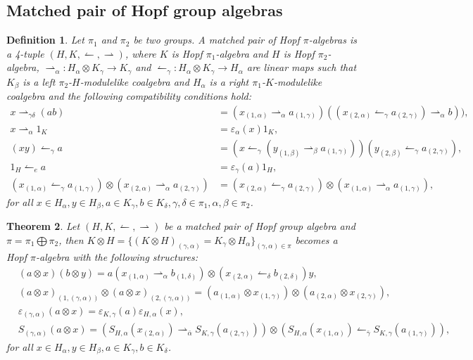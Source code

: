 \documentclass[11pt]{article}
\def\a{\alpha}
\def\b{\beta}
\def\d{\delta}
\def\g{\gamma}
\def\o{\otimes}
\def\v{\varepsilon}
\newtheorem{theorem}{Theorem}[section]
\newtheorem{definition}[theorem]{Definition}
\begin{document}
\subsection{Matched pair of Hopf group algebras}



 \begin{definition}
Let $\pi_1$ and $\pi_2$ be two groups. A matched pair of Hopf $\pi$-algebras is a 4-tuple $(H, K,\leftharpoonup,\rightharpoonup)$, where $K$ is Hopf $\pi_1$-algebra and $H$ is Hopf $\pi_2$-algebra, $\rightharpoonup_{\a}:H_\a\o K_\g\rightarrow K_\g$ and $\leftharpoonup_{\g}:H_\a\o K_\g \rightarrow H_\a$ are linear maps such that $K_\b$ is a left $\pi_2$-$H$-modulelike coalgebra and $H_\a$ is a right $\pi_1$-$K$-modulelike coalgebra and the following compatibility
conditions hold:
\begin{align}
x\rightharpoonup_{\g\d}(ab)&=(x_{(1,\a)}\rightharpoonup_{\a}a_{(1,\g)})((x_{(2,\a)}\leftharpoonup_{\g}a_{(2,\g)})\rightharpoonup_\a b)),\label{mp1}\\
x\rightharpoonup_{\a}1_K&=\v_\a(x)1_K,\label{mp2}\\
(xy)\leftharpoonup_{\g}a&=(x\leftharpoonup_{\g}(y_{(1,\b)}\rightharpoonup_{\b}a_{(1,\g)}))(y_{(2,\b)}\leftharpoonup_{\g}a_{(2,\g)}),\label{mp3}\\
1_H\leftharpoonup_e a&=\v_\g(a)1_H,\label{mp4}\\
(x_{(1,\a)}\leftharpoonup_\g a_{(1,\g)})\o(x_{(2,\a)}\rightharpoonup_\a a_{(2,\g)})&=(x_{(2,\a)}\leftharpoonup_\g a_{(2,\g)})\o(x_{(1,\a)}\rightharpoonup_\a a_{(1,\g)}),\label{mp5}
\end{align}
for all $x\in H_\a,y\in H_\b,a\in K_\g,b\in K_\d,\g,\d\in\pi_1,\a,\b\in\pi_2$.
\end{definition}

\begin{theorem}
Let $(H, K,\leftharpoonup,\rightharpoonup)$ be a matched pair of Hopf group algebra and $\pi=\pi_1\bigoplus\pi_2$, then $K\o H=\{(K\o H)_{(\g,\a)}=K_\g\o H_\a\}_{(\g,\a)\in\pi}$ becomes a Hopf $\pi$-algebra with the following structures:
\begin{align*}
&(a\o x)(b\o y)=a(x_{(1,\a)}\rightharpoonup_\a b_{(1,\d)})\o(x_{(2,\a)}\leftharpoonup_\d b_{(2,\d)})y,\\
&(a\o x)_{(1,(\g,\a))}\o (a\o x)_{(2,(\g,\a))}=(a_{(1,\a)}\o x_{(1,\g)})\o (a_{(2,\a)}\o x_{(2,\g)}),\\
&\v_{(\g,\a)}(a\o x)=\v_{K,\g}(a) \v_{H,\a}(x),\\
&S_{(\g,\a)}(a\o x)=(S_{H,\a}(x_{(2,\a)})\rightharpoonup_{\bar{\a}}S_{K,\g}(a_{(2,\g)}))\o(S_{H,\a}(x_{(1,\a)})\leftharpoonup_{\bar{\g}}S_{K,\g}(a_{(1,\g)})),
\end{align*}
for all $x\in H_\a,y\in H_\b,a\in K_\g,b\in K_\d$.
\end{theorem}
\end{document}

